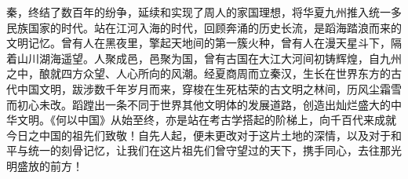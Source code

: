 秦，终结了数百年的纷争，延续和实现了周人的家国理想，将华夏九州推入统一多民族国家的时代。站在江河入海的时代，回顾奔涌的历史长流，是蹈海踏浪而来的文明记忆。曾有人在黑夜里，擎起天地间的第一簇火种，曾有人在漫天星斗下，隔着山川湖海遥望。人聚成邑，邑聚为国，曾有古国在大江大河间初铸辉煌，自九州之中，酿就四方众望、人心所向的风潮。经夏商周而立秦汉，生长在世界东方的古代中国文明，跋涉数千年岁月而来，穿梭在生死枯荣的古文明之林间，历风尘霜雪而初心未改。蹈蹚出一条不同于世界其他文明体的发展道路，创造出灿烂盛大的中华文明。《何以中国》从始至终，亦是站在考古学搭起的阶梯上，向千百代来成就今日之中国的祖先们致敬！自先人起，便未更改对于这片土地的深情，以及对于和平与统一的刻骨记忆，让我们在这片祖先们曾守望过的天下，携手同心，去往那光明盛放的前方！

